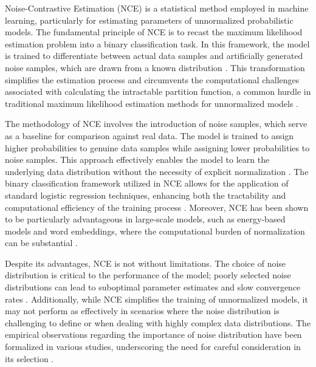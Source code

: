 Noise-Contrastive Estimation (NCE) is a statistical method employed in machine learning, particularly for estimating parameters of unnormalized probabilistic models. The fundamental principle of NCE is to recast the maximum likelihood estimation problem into a binary classification task. In this framework, the model is trained to differentiate between actual data samples and artificially generated noise samples, which are drawn from a known distribution \citep{10.48550/arxiv.1711.00658}. This transformation simplifies the estimation process and circumvents the computational challenges associated with calculating the intractable partition function, a common hurdle in traditional maximum likelihood estimation methods for unnormalized models \citep{10.48550/arxiv.2110.11271}.

The methodology of NCE involves the introduction of noise samples, which serve as a baseline for comparison against real data. The model is trained to assign higher probabilities to genuine data samples while assigning lower probabilities to noise samples. This approach effectively enables the model to learn the underlying data distribution without the necessity of explicit normalization \citep{10.21437/interspeech.2016-1295}. The binary classification framework utilized in NCE allows for the application of standard logistic regression techniques, enhancing both the tractability and computational efficiency of the training process \citep{10.18653/v1/e17-2003}. Moreover, NCE has been shown to be particularly advantageous in large-scale models, such as energy-based models and word embeddings, where the computational burden of normalization can be substantial \citep{10.48550/arxiv.2101.03288}.

Despite its advantages, NCE is not without limitations. The choice of noise distribution is critical to the performance of the model; poorly selected noise distributions can lead to suboptimal parameter estimates and slow convergence rates \citep{10.48550/arxiv.2110.11271}. Additionally, while NCE simplifies the training of unnormalized models, it may not perform as effectively in scenarios where the noise distribution is challenging to define or when dealing with highly complex data distributions. The empirical observations regarding the importance of noise distribution have been formalized in various studies, underscoring the need for careful consideration in its selection \citep{10.48550/arxiv.2110.11271}.

